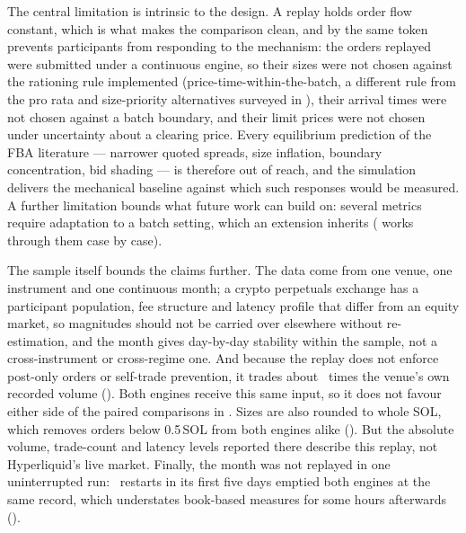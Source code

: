 The central limitation is intrinsic to the design. A replay holds order flow
constant, which is what makes the comparison clean, and by the same token
prevents participants from responding to the mechanism: the orders replayed
were submitted under a continuous engine, so their sizes were not chosen
against the rationing rule implemented (price-time-within-the-batch, a
different rule from the pro rata and size-priority alternatives surveyed
in ), their arrival times
were not chosen against a batch boundary, and their limit prices were not
chosen under uncertainty about a clearing price. Every equilibrium
prediction of the FBA literature --- narrower quoted spreads, size
inflation, boundary concentration, bid shading --- is therefore out of
reach, and the simulation delivers the mechanical baseline against which
such responses would be measured. A further limitation bounds what future
work can build on: several metrics require adaptation to a batch setting,
which an extension inherits ( works through them
case by case).

The sample itself bounds the claims further. The data come from one
venue, one instrument and one continuous month; a crypto perpetuals
exchange has a participant population, fee structure and latency profile
that differ from an equity market, so magnitudes should not be carried
over elsewhere without re-estimation, and the month gives day-by-day
stability within the sample, not a cross-instrument or cross-regime one.
And because the replay does not enforce post-only orders or self-trade
prevention, it trades about \VerCdaOverVenue\ times the venue's own recorded
volume (). Both engines receive this same input, so
it does not favour either side of the paired comparisons in
. Sizes are also rounded to whole SOL, which removes
orders below 0.5\,SOL from both engines alike (). But the
absolute volume, trade-count and latency levels reported there describe
this replay, not Hyperliquid's live market. Finally, the month was not
replayed in one uninterrupted run: \VerResetN\ restarts in its first five
days emptied both engines at the same record, which understates book-based
measures for some hours afterwards ().

